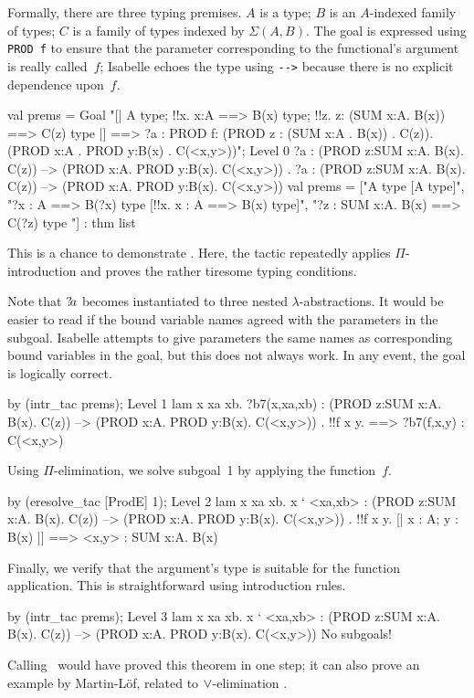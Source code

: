 Formally, there are three typing premises.  $A$ is a type; $B$ is an
$A$-indexed family of types; $C$ is a family of types indexed by
$\Sigma(A,B)$.  The goal is expressed using \hbox{\tt PROD f} to ensure
that the parameter corresponding to the functional's argument is really
called~$f$; Isabelle echoes the type using \verb|-->| because there is no
explicit dependence upon~$f$.
\begin{ttbox}
val prems = Goal
    "[| A type; !!x. x:A ==> B(x) type;                           \ttback
\ttback               !!z. z: (SUM x:A. B(x)) ==> C(z) type             \ttback
\ttback    |] ==> ?a : PROD f: (PROD z : (SUM x:A . B(x)) . C(z)).      \ttback
\ttback                     (PROD x:A . PROD y:B(x) . C(<x,y>))";
\ttbreak
{\out Level 0}
{\out ?a : (PROD z:SUM x:A. B(x). C(z)) -->}
{\out      (PROD x:A. PROD y:B(x). C(<x,y>))}
{. ?a : (PROD z:SUM x:A. B(x). C(z)) -->}
{\out          (PROD x:A. PROD y:B(x). C(<x,y>))}
\ttbreak
{\out val prems = ["A type  [A type]",}
{\out              "?x : A ==> B(?x) type  [!!x. x : A ==> B(x) type]",}
{\out              "?z : SUM x:A. B(x) ==> C(?z) type}
{\out               [!!z. z : SUM x:A. B(x) ==> C(z) type]"] : thm list}
\end{ttbox}
This is a chance to demonstrate .  Here, the tactic
repeatedly applies $\Pi$-introduction and proves the rather
tiresome typing conditions.  

Note that ${?\!a}$ becomes instantiated to three nested
$\lambda$-abstractions.  It would be easier to read if the bound variable
names agreed with the parameters in the subgoal.  Isabelle attempts to give
parameters the same names as corresponding bound variables in the goal, but
this does not always work.  In any event, the goal is logically correct.
\begin{ttbox}
by (intr_tac prems);
{\out Level 1}
{\out lam x xa xb. ?b7(x,xa,xb)}
{\out : (PROD z:SUM x:A. B(x). C(z)) --> (PROD x:A. PROD y:B(x). C(<x,y>))}
{. !!f x y.}
{ ==>}
{\out        ?b7(f,x,y) : C(<x,y>)}
\end{ttbox}
Using $\Pi$-elimination, we solve subgoal~1 by applying the function~$f$.
\begin{ttbox}
by (eresolve_tac [ProdE] 1);
{\out Level 2}
{\out lam x xa xb. x ` <xa,xb>}
{\out : (PROD z:SUM x:A. B(x). C(z)) --> (PROD x:A. PROD y:B(x). C(<x,y>))}
{. !!f x y. [| x : A; y : B(x) |] ==> <x,y> : SUM x:A. B(x)}
\end{ttbox}
Finally, we verify that the argument's type is suitable for the function
application.  This is straightforward using introduction rules.
\begin{ttbox}
by (intr_tac prems);
{\out Level 3}
{\out lam x xa xb. x ` <xa,xb>}
{\out : (PROD z:SUM x:A. B(x). C(z)) --> (PROD x:A. PROD y:B(x). C(<x,y>))}
{\out No subgoals!}
\end{ttbox}
Calling~ would have proved this theorem in one step; it can
also prove an example by Martin-L\"of, related to $\vee$-elimination
\cite[page~58]{martinlof84}.



